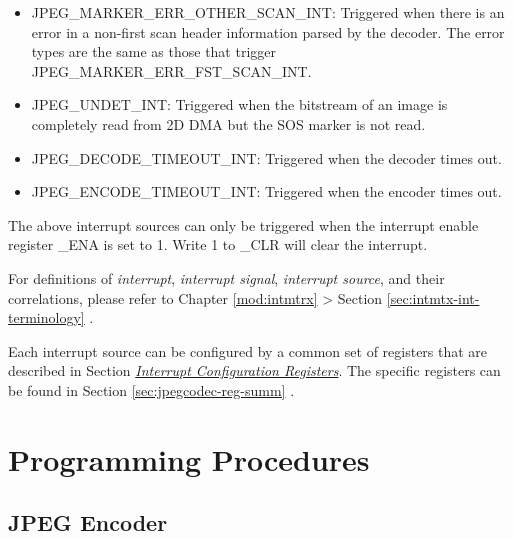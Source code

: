 \documentclass[main\_\_EN.tex]{subfiles}
\begin{document}
\begin{itemize}
\begin{itemize}
\end{itemize}
\item JPEG\_MARKER\_ERR\_OTHER\_SCAN\_INT: Triggered when there is an error in a non-first scan header information parsed by the decoder. The error types are the same as those that trigger JPEG\_MARKER\_ERR\_FST\_SCAN\_INT.
\item JPEG\_UNDET\_INT: Triggered when the bitstream of an image is completely read from 2D DMA but the SOS marker is not read.
\item JPEG\_DECODE\_TIMEOUT\_INT: Triggered when the decoder times out.
\item JPEG\_ENCODE\_TIMEOUT\_INT: Triggered when the encoder times out.
\end{itemize}

The above interrupt sources can only be triggered when the interrupt enable register \_ENA is set to 1. Write 1 to \_CLR will clear the interrupt.

\begin{tiplisting}
For definitions of \textit{interrupt}, \textit{interrupt signal}, \textit{interrupt source}, and their correlations, please refer to Chapter \ref{mod:intmtrx} \textit{} > Section \ref{sec:intmtx-int-terminology} \textit{}.
\end{tiplisting}

Each interrupt source can be configured by a common set of registers that are described in Section \hyperref[interrupt-config-registers]{\textit{Interrupt Configuration Registers}}. The specific registers can be found in Section \ref{sec:jpegcodec-reg-summ} \textit{}.




\section{Programming Procedures}
\label{sec:jpegcodec-prog-procedures}

\subsection{JPEG Encoder}
\label{sec:jpegcodec-enc-prog}
\end{document}
